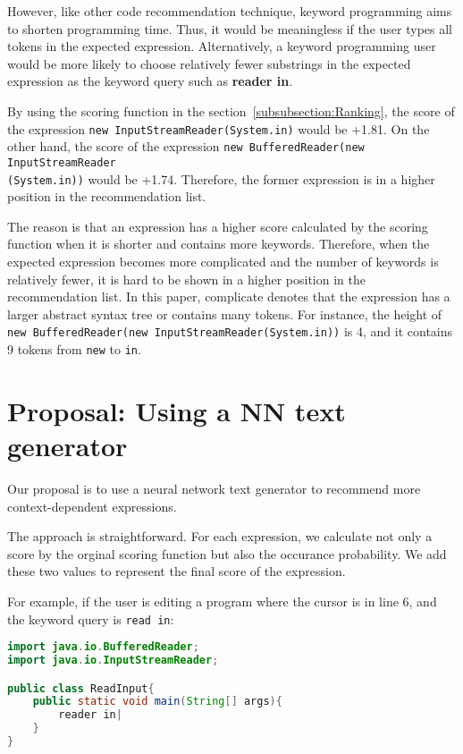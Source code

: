 \documentclass[PRO,english]{ipsj}
\begin{document}
However, like other code recommendation technique, keyword programming aims to shorten programming time. Thus, it would be meaningless if the user types all tokens in the expected expression. Alternatively, a keyword programming user would be more likely to choose relatively fewer substrings in the expected expression as the keyword query such as \textbf{reader in}. 

By using the scoring function in the section~\ref{subsubsection:Ranking}, the score of the expression \texttt{new InputStreamReader(System.in)} would be +1.81. On the other hand, the score of the expression \texttt{new BufferedReader(new InputStreamReader}\\\texttt{(System.in))} would be +1.74. Therefore, the former expression is in a higher position in the recommendation list.

The reason is that an expression has a higher score calculated by the scoring function when it is shorter and contains more keywords. Therefore, when the expected expression becomes more complicated and the number of keywords is relatively fewer, it is hard to be shown in a higher position in the recommendation list. In this paper, complicate denotes that the expression has a larger abstract syntax tree or contains many tokens. For instance, the height of \texttt{new BufferedReader(new InputStreamReader(System.in))} is 4, and it contains 9 tokens from \texttt{new} to \texttt{in}.

\section{Proposal: Using a NN text generator}
Our proposal is to use a neural network text generator to recommend more context-dependent expressions.

The approach is straightforward. For each expression, we calculate not only a score by the orginal scoring function but also the occurance probability. We add these two values to represent the final score of the expression.

For example, if the user is editing a program where the cursor is in line 6, and the keyword query is \texttt{read in}:
\begin{lstlisting}[language=Java]
import java.io.BufferedReader;
import java.io.InputStreamReader;

public class ReadInput{
	public static void main(String[] args){
	    reader in|
	}
}
\end{lstlisting}
\end{document}
